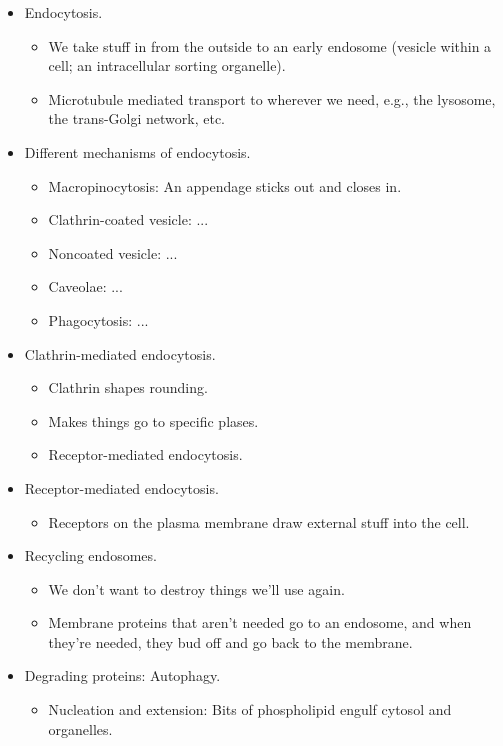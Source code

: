 \documentclass[../notes.tex]{subfiles}
\begin{document}
\begin{itemize}
    \item Endocytosis.
    \begin{itemize}
        \item We take stuff in from the outside to an early endosome (vesicle within a cell; an intracellular sorting organelle).
        \item Microtubule mediated transport to wherever we need, e.g., the lysosome, the trans-Golgi network, etc.
    \end{itemize}
    \item Different mechanisms of endocytosis.
    \begin{itemize}
        \item Macropinocytosis: An appendage sticks out and closes in.
        \item Clathrin-coated vesicle: ...
        \item Noncoated vesicle: ...
        \item Caveolae: ...
        \item Phagocytosis: ...
    \end{itemize}
    \item Clathrin-mediated endocytosis.
    \begin{itemize}
        \item Clathrin shapes rounding.
        \item Makes things go to specific plases.
        \item Receptor-mediated endocytosis.
    \end{itemize}
    \item Receptor-mediated endocytosis.
    \begin{itemize}
        \item Receptors on the plasma membrane draw external stuff into the cell.
    \end{itemize}
    \item Recycling endosomes.
    \begin{itemize}
        \item We don't want to destroy things we'll use again.
        \item Membrane proteins that aren't needed go to an endosome, and when they're needed, they bud off and go back to the membrane.
    \end{itemize}
    \item Degrading proteins: Autophagy.
    \begin{itemize}
        \item Nucleation and extension: Bits of phospholipid engulf cytosol and organelles.

\end{itemize}
\end{itemize}
\end{document}
